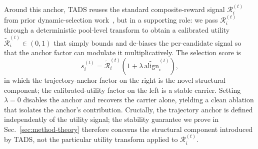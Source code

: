 Around this anchor, \textsc{TADS} reuses the standard
composite-reward signal $\mathcal{R}_i^{(t)}$ from prior
dynamic-selection work~\cite{kung2023activeit, sun2025dots}, but
in a supporting role: we pass $\mathcal{R}_i^{(t)}$ through a
deterministic pool-level transform to obtain a calibrated utility
$\tilde{\mathcal{R}}_i^{(t)} \in (0,1)$ that simply bounds and
de-biases the per-candidate signal so that the anchor factor can
modulate it multiplicatively. The selection score is
\[
s_i^{(t)}
=
\tilde{\mathcal{R}}_i^{(t)}
\left(
1+\lambda\,\widetilde{\mathrm{align}}_i^{(t)}
\right),
\]
in which the trajectory-anchor factor on the right is the novel
structural component; the calibrated-utility factor on the left
is a stable carrier. Setting $\lambda=0$ disables the anchor and
recovers the carrier alone, yielding a clean ablation that
isolates the anchor's contribution. Crucially, the trajectory
anchor is defined independently of the utility signal; the
stability guarantee we prove in Sec.~\ref{sec:method-theory}
therefore concerns the structural component introduced by
\textsc{TADS}, not the particular utility transform applied to
$\mathcal{R}_i^{(t)}$.
